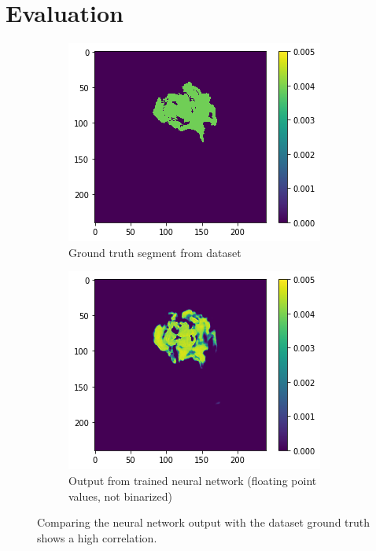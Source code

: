 \section{Evaluation}


\begin{figure}[H]
    \centering
    \begin{subfigure}[t]{.5\textwidth}
        \centering
        \includegraphics[width=\linewidth]{chapters/04_segmentation/images/evaluate1.png}
        \caption{Ground truth segment from dataset}
    \end{subfigure}%
    \begin{subfigure}[t]{.5\textwidth}
        \centering
        \includegraphics[width=\linewidth]{chapters/04_segmentation/images/evaluate2.png}
        \caption{Output from trained neural network (floating point values, not binarized)}
    \end{subfigure}
    \caption{Comparing the neural network output with the dataset ground truth shows a high correlation.}
\end{figure}


